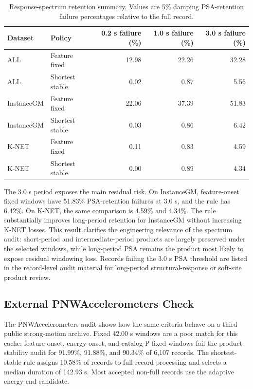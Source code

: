 \documentclass[12pt,letterpaper]{article}
\begin{document}
\begin{table}[!htbp]
\centering
\caption{Response-spectrum retention summary. Values are 5\% damping PSA-retention failure percentages relative to the full record.}
\label{tab:response}
\begin{singlespace}
\footnotesize
\setlength{\tabcolsep}{3pt}
\begin{tabular}{llrrr}
\toprule
Dataset & Policy & 0.2 s failure (\%) & 1.0 s failure (\%) & 3.0 s failure (\%) \\
\midrule
ALL & Feature fixed & 12.98 & 22.26 & 32.28 \\
ALL & Shortest stable & 0.02 & 0.87 & 5.56 \\
InstanceGM & Feature fixed & 22.06 & 37.39 & 51.83 \\
InstanceGM & Shortest stable & 0.03 & 0.86 & 6.42 \\
K-NET & Feature fixed & 0.11 & 0.83 & 4.59 \\
K-NET & Shortest stable & 0.00 & 0.89 & 4.34 \\
\bottomrule
\end{tabular}
\end{singlespace}
\end{table}

The 3.0 s period exposes the main residual risk. On InstanceGM, feature-onset fixed windows have 51.83\% PSA-retention failures at 3.0 s, and the rule has 6.42\%. On K-NET, the same comparison is 4.59\% and 4.34\%. The rule substantially improves long-period retention for InstanceGM without increasing K-NET losses. This result clarifies the engineering relevance of the spectrum audit: short-period and intermediate-period products are largely preserved under the selected windows, while long-period PSA remains the product most likely to expose residual windowing loss. Records failing the 3.0 s PSA threshold are listed in the record-level audit material for long-period structural-response or soft-site product review.

\subsection{External PNWAccelerometers Check}\label{external-pnwaccelerometers-check}

The PNWAccelerometers audit shows how the same criteria behave on a third public strong-motion archive. Fixed 42.00 s windows are a poor match for this cache: feature-onset, energy-onset, and catalog-P fixed windows fail the product-stability audit for 91.99\%, 91.88\%, and 90.34\% of 6,107 records. The shortest-stable rule assigns 10.58\% of records to full-record processing and selects a median duration of 142.93 s. Most accepted non-full records use the adaptive energy-end candidate.
\end{document}
